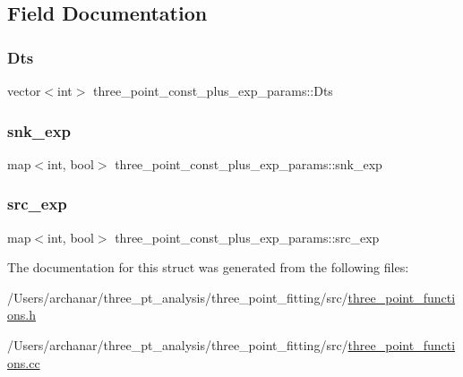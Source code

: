 \subsection{Field Documentation}
\mbox{\label{structthree__point__const__plus__exp__params_a83d585a244f59d6cd018e26aefc4881d}} 
\subsubsection{\texorpdfstring{Dts}{Dts}}
{\footnotesize\ttfamily vector$<$int$>$ three\+\_\+point\+\_\+const\+\_\+plus\+\_\+exp\+\_\+params\+::\+Dts}

\mbox{\label{structthree__point__const__plus__exp__params_a229df803cee3065e6bae76b520da8a3a}} 
\subsubsection{\texorpdfstring{snk\_exp}{snk\_exp}}
{\footnotesize\ttfamily map$<$int, bool$>$ three\+\_\+point\+\_\+const\+\_\+plus\+\_\+exp\+\_\+params\+::snk\+\_\+exp}

\mbox{\label{structthree__point__const__plus__exp__params_ab7455481b4af8b3298f723ff2b176c63}} 
\subsubsection{\texorpdfstring{src\_exp}{src\_exp}}
{\footnotesize\ttfamily map$<$int, bool$>$ three\+\_\+point\+\_\+const\+\_\+plus\+\_\+exp\+\_\+params\+::src\+\_\+exp}



The documentation for this struct was generated from the following files\+:\begin{DoxyCompactItemize}
\item 
/\+Users/archanar/three\+\_\+pt\+\_\+analysis/three\+\_\+point\+\_\+fitting/src/\mbox{\hyperlink{three__point__functions_8h}{three\+\_\+point\+\_\+functions.\+h}}\item 
/\+Users/archanar/three\+\_\+pt\+\_\+analysis/three\+\_\+point\+\_\+fitting/src/\mbox{\hyperlink{three__point__functions_8cc}{three\+\_\+point\+\_\+functions.\+cc}}\end{DoxyCompactItemize}
